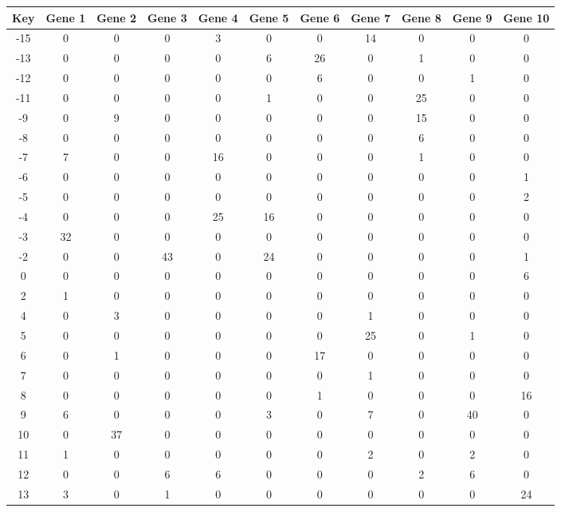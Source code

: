 \begin{tabular}{|c|c|c|c|c|c|c|c|c|c|c|}
\hline
Key & Gene 1 & Gene 2 & Gene 3 & Gene 4 & Gene 5 & Gene 6 & Gene 7 & Gene 8 & Gene 9 & Gene 10 \\
\hline
-15 & 0 & 0 & 0 & 3 & 0 & 0 & 14 & 0 & 0 & 0 \\
-13 & 0 & 0 & 0 & 0 & 6 & 26 & 0 & 1 & 0 & 0 \\
-12 & 0 & 0 & 0 & 0 & 0 & 6 & 0 & 0 & 1 & 0 \\
-11 & 0 & 0 & 0 & 0 & 1 & 0 & 0 & 25 & 0 & 0 \\
-9 & 0 & 9 & 0 & 0 & 0 & 0 & 0 & 15 & 0 & 0 \\
-8 & 0 & 0 & 0 & 0 & 0 & 0 & 0 & 6 & 0 & 0 \\
-7 & 7 & 0 & 0 & 16 & 0 & 0 & 0 & 1 & 0 & 0 \\
-6 & 0 & 0 & 0 & 0 & 0 & 0 & 0 & 0 & 0 & 1 \\
-5 & 0 & 0 & 0 & 0 & 0 & 0 & 0 & 0 & 0 & 2 \\
-4 & 0 & 0 & 0 & 25 & 16 & 0 & 0 & 0 & 0 & 0 \\
-3 & 32 & 0 & 0 & 0 & 0 & 0 & 0 & 0 & 0 & 0 \\
-2 & 0 & 0 & 43 & 0 & 24 & 0 & 0 & 0 & 0 & 1 \\
0 & 0 & 0 & 0 & 0 & 0 & 0 & 0 & 0 & 0 & 6 \\
2 & 1 & 0 & 0 & 0 & 0 & 0 & 0 & 0 & 0 & 0 \\
4 & 0 & 3 & 0 & 0 & 0 & 0 & 1 & 0 & 0 & 0 \\
5 & 0 & 0 & 0 & 0 & 0 & 0 & 25 & 0 & 1 & 0 \\
6 & 0 & 1 & 0 & 0 & 0 & 17 & 0 & 0 & 0 & 0 \\
7 & 0 & 0 & 0 & 0 & 0 & 0 & 1 & 0 & 0 & 0 \\
8 & 0 & 0 & 0 & 0 & 0 & 1 & 0 & 0 & 0 & 16 \\
9 & 6 & 0 & 0 & 0 & 3 & 0 & 7 & 0 & 40 & 0 \\
10 & 0 & 37 & 0 & 0 & 0 & 0 & 0 & 0 & 0 & 0 \\
11 & 1 & 0 & 0 & 0 & 0 & 0 & 2 & 0 & 2 & 0 \\
12 & 0 & 0 & 6 & 6 & 0 & 0 & 0 & 2 & 6 & 0 \\
13 & 3 & 0 & 1 & 0 & 0 & 0 & 0 & 0 & 0 & 24 \\
\hline
\end{tabular}
